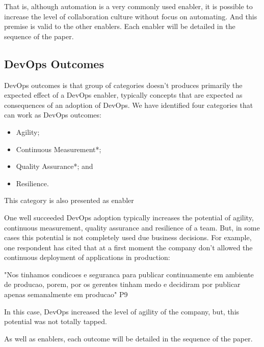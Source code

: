 That is, although automation is a very commonly used enabler, it is possible to
increase the level of collaboration culture without focus on automating. And
this premise is valid to the other enablers. Each enabler will be detailed in
the sequence of the paper.

\subsection{DevOps Outcomes}
DevOps outcomes is that group of categories doesn't produces primarily the
expected effect of a DevOps enabler, typically concepts that are expected as
consequences of an adoption of DevOps. We have identified four categories that
can work as DevOps outcomes:

\begin{itemize}
\item Agility;
\item Continuous Measurement*;
\item Quality Assurance*; and
\item Resilience.
\end{itemize}

\footnotesize * This category is also presented as enabler


\normalsize
One well succeeded DevOps adoption typically increases the potential of
agility, continuous measurement, quality assurance and resilience of a team.
But, in some cases this potential is not completely used due business
decisions. For example, one respondent has cited that at a first moment the
company don't allowed the continuous deployment of applications in production:

"Nos tinhamos condicoes e seguranca para publicar continuamente em ambiente de
producao, porem, por os gerentes tinham medo e decidiram por publicar apenas
semanalmente em producao" P9

In this case, DevOps increased the level of agility of the company, but, this
potential was not totally tapped.

As well as enablers, each outcome will be detailed in the sequence of the paper.
